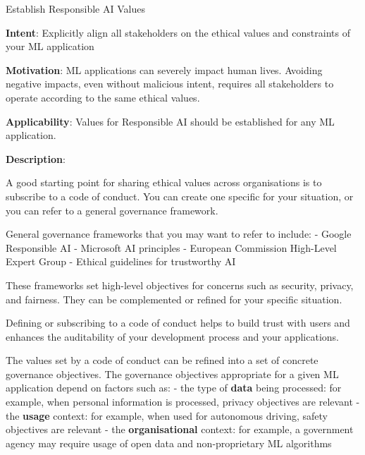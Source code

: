   
  \begin{frame}[plain]{ Establish Responsible AI Values
 }

  \textbf{Intent}: Explicitly align all stakeholders on the ethical values and constraints of your ML application
 

  \textbf{Motivation}: ML applications can severely impact human lives. Avoiding negative impacts, even without malicious intent, requires all stakeholders to operate according to the same ethical values.
 

  \textbf{Applicability}: Values for Responsible AI should be established for any ML application.
 

  \textbf{Description}: 

A good starting point for sharing ethical values across organisations is to subscribe to a code of conduct. You can create one specific for your situation, or you can refer to a general governance framework.


General governance frameworks that you may want to refer to include:
- Google Responsible AI
- Microsoft AI principles
- European Commission High-Level Expert Group - Ethical guidelines for trustworthy AI


These frameworks set high-level objectives for concerns such as security, privacy, and fairness. They can be complemented or refined for your specific situation.


Defining or subscribing to a code of conduct helps to build trust with users and enhances the auditability of your development process and your applications.


The values set by a code of conduct can be refined into a set of concrete governance objectives.
The governance objectives appropriate for a given ML application depend on factors such as:
- the type of \textbf{data} being processed: for example, when personal information is processed, privacy objectives are relevant
- the \textbf{usage} context: for example, when used for autonomous driving, safety objectives are relevant
- the \textbf{organisational} context: for example, a government agency may require usage of open data and non-proprietary ML algorithms


 


  \end{frame}

